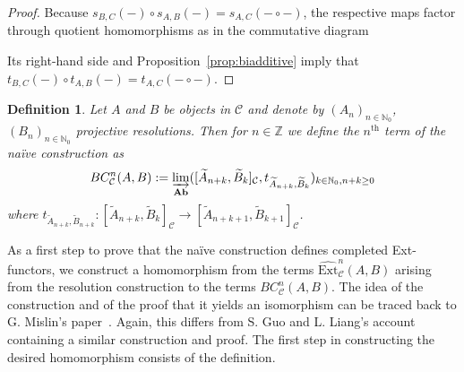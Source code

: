 \documentclass[12pt,a4paper]{article}
\numberwithin{equation}{section}
\newtheorem{defn}[thm]{Definition}
\theoremstyle{nonumberplain}
\newtheorem{proof}{Proof}
\begin{document}
\begin{proof}
Because $s_{B, C}(-) \circ s_{A, B}(-) = s_{A, C}(- \circ -)$, the respective maps factor through quotient homomorphisms as in the commutative diagram
\begin{center}
\end{center}
Its right-hand side and Proposition~\ref{prop:biadditive} imply that $t_{B, C}(-) \circ t_{A, B}(-) = t_{A, C}(- \circ -)$.
\end{proof}

\begin{defn}\label{defn:naiveconstr}
Let $A$ and $B$ be objects in $\mathcal{C}$ and denote by $(A_n)_{n \in \mathbb{N}_0}$, $(B_n)_{n \in \mathbb{N}_0}$ projective resolutions. Then for $n \in \mathbb{Z}$ we define the $n^{\text{th}}$ term of the naïve construction as
\[ BC_{\mathcal{C}}^n(A, B) := \varinjlim_{\mathbf{Ab}}([\widetilde{A}_{n+k}, \widetilde{B}_k]_{\mathcal{C}}, t_{\widetilde{A}_{n+k}, \widetilde{B}_k})_{k \in \mathbb{N}_0, n+k \geq 0} \]
where $t_{\widetilde{A}_{n+k}, \widetilde{B}_{n+k}}: [\widetilde{A}_{n+k}, \widetilde{B}_k]_{\mathcal{C}} \rightarrow [\widetilde{A}_{n+k+1}, \widetilde{B}_{k+1}]_{\mathcal{C}}$. 
\end{defn}

As a first step to prove that the naïve construction defines completed Ext-functors, we construct a homomorphism from the terms $\widehat{\mathrm{Ext}}_{\mathcal{C}}^n(A, B)$ arising from the resolution construction to the terms $BC_{\mathcal{C}}^n(A, B)$. The idea of the construction and of the proof that it yields an isomorphism can be traced back to G.\! Mislin's paper~\cite[p.~299]{mis94}. Again, this differs from S.\! Guo and L.\! Liang's account~\cite[pp.~18--19]{guo23} containing a similar construction and proof. The first step in constructing the desired homomorphism consists of the definition.
\end{document}
